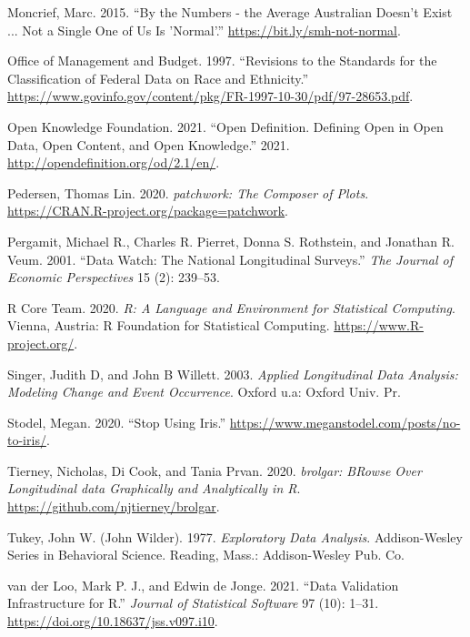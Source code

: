 \documentclass{article}
\newlength{\cslhangindent}
\newlength{\cslentryspacingunit} %
\newenvironment{CSLReferences}[2] %
 {%
  \setlength{\parindent}{0pt}
  \ifodd #1
  \let\oldpar\par
  \def\par{\hangindent=\cslhangindent\oldpar}
  \fi
  \setlength{\parskip}{#2\cslentryspacingunit}
 }%
 {}
\begin{document}
\begin{CSLReferences}{1}{0}
\leavevmode{}%
Moncrief, Marc. 2015. {``By the Numbers - the Average Australian Doesn't Exist ... Not a Single One of Us Is 'Normal'.''} \url{https://bit.ly/smh-not-normal}.

\leavevmode{}%
Office of Management and Budget. 1997. {``Revisions to the Standards for the Classification of Federal Data on Race and Ethnicity.''} \url{https://www.govinfo.gov/content/pkg/FR-1997-10-30/pdf/97-28653.pdf}.

\leavevmode{}%
Open Knowledge Foundation. 2021. {``Open Definition. Defining Open in Open Data, Open Content, and Open Knowledge.''} 2021. \url{http://opendefinition.org/od/2.1/en/}.

\leavevmode{}%
Pedersen, Thomas Lin. 2020. \emph{{patchwork: The Composer of Plots}}. \url{https://CRAN.R-project.org/package=patchwork}.

\leavevmode{}%
Pergamit, Michael R., Charles R. Pierret, Donna S. Rothstein, and Jonathan R. Veum. 2001. {``Data Watch: The National Longitudinal Surveys.''} \emph{The Journal of Economic Perspectives} 15 (2): 239--53.

\leavevmode{}%
R Core Team. 2020. \emph{R: A Language and Environment for Statistical Computing}. Vienna, Austria: R Foundation for Statistical Computing. \url{https://www.R-project.org/}.

\leavevmode{}%
Singer, Judith D, and John B Willett. 2003. \emph{Applied Longitudinal Data Analysis: Modeling Change and Event Occurrence}. Oxford u.a: Oxford Univ. Pr.

\leavevmode{}%
Stodel, Megan. 2020. {``Stop Using Iris.''} \url{https://www.meganstodel.com/posts/no-to-iris/}.

\leavevmode{}%
Tierney, Nicholas, Di Cook, and Tania Prvan. 2020. \emph{{brolgar: BRowse Over Longitudinal data Graphically and Analytically in R}}. \url{https://github.com/njtierney/brolgar}.

\leavevmode{}%
Tukey, John W. (John Wilder). 1977. \emph{Exploratory Data Analysis}. Addison-Wesley Series in Behavioral Science. Reading, Mass.: Addison-Wesley Pub. Co.

\leavevmode{}%
van der Loo, Mark P. J., and Edwin de Jonge. 2021. {``Data Validation Infrastructure for {R}.''} \emph{Journal of Statistical Software} 97 (10): 1--31. \url{https://doi.org/10.18637/jss.v097.i10}.


\end{CSLReferences}
\end{document}
